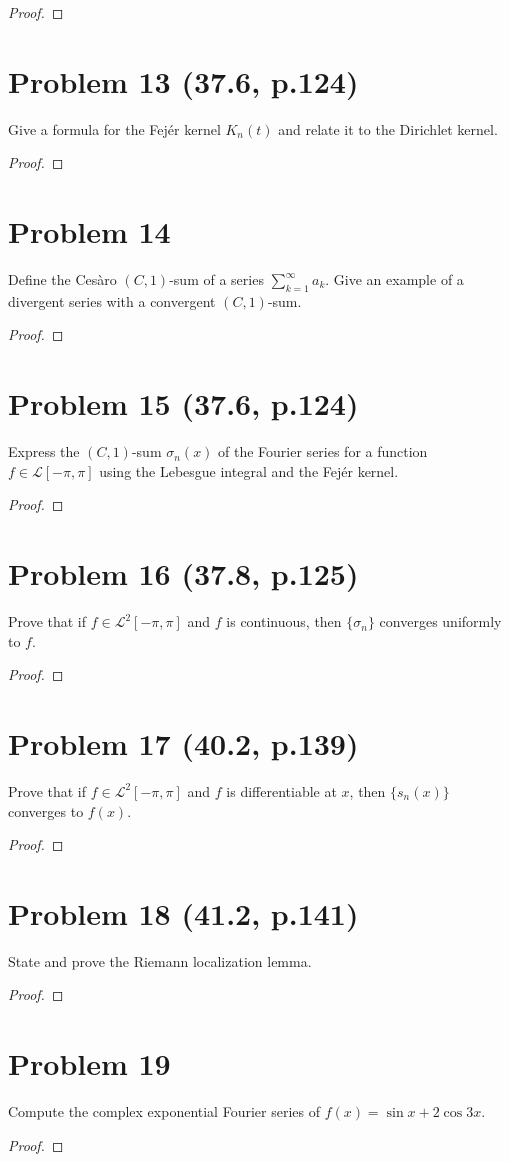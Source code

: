 \documentclass[12pt]{article}
\begin{document}
\begin{proof}
\end{proof}

\section*{Problem 13 (37.6, p.124)}
Give a formula for the Fejér kernel $K_{n}(t)$ and relate it to the Dirichlet kernel.

\begin{proof}
\end{proof}

\section*{Problem 14}
Define the Cesàro $(C,1)$-sum of a series $\sum_{k=1}^{\infty} a_{k}$. Give an example of a divergent series with a convergent $(C, 1)$-sum.

\begin{proof}
\end{proof}

\section*{Problem 15 (37.6, p.124)}
Express the $(C, 1)$-sum $\sigma_{n}(x)$ of the Fourier series for a function $f \in \mathcal{L}[-\pi,\pi]$ using the Lebesgue integral and the Fejér kernel.

\begin{proof}
\end{proof}

\section*{Problem 16 (37.8, p.125)}
Prove that if $f \in \mathcal{L}^{2}[-\pi,\pi]$ and $f$ is continuous, then $\{\sigma_{n}\}$ converges uniformly to $f$.

\begin{proof}
\end{proof}

\section*{Problem 17 (40.2, p.139)}
Prove that if $f \in \mathcal{L}^{2}[-\pi,\pi]$ and $f$ is differentiable at $x$, then $\{s_{n}(x)\}$ converges to $f(x)$.

\begin{proof}
\end{proof}

\section*{Problem 18 (41.2, p.141)}
State and prove the Riemann localization lemma.

\begin{proof}
\end{proof}

\section*{Problem 19}
Compute the complex exponential Fourier series of $f(x) = \sin x + 2 \cos 3x$.

\begin{proof}
\end{proof}
\end{document}
